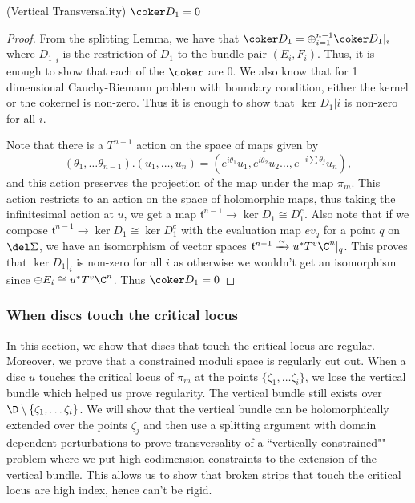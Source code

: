 \begin{Theorem}(Vertical Transversality)\label{thm:verttran}
$\coker D_1 = 0$
\end{Theorem}
\begin{proof}
From the splitting Lemma, we have that $\coker D_1 = \oplus_{i=1}^{n-1} \coker D_1|_i$ where $D_1|_i$ is the restriction of $D_1$ to the bundle pair $(E_i,F_i)$. Thus, it is enough to show that each of the $\coker$ are 0. We also know that for 1 dimensional Cauchy-Riemann problem with boundary condition, either the kernel or the cokernel is non-zero. Thus it is enough to show that $\ker D_1|i$ is non-zero for all $i$.


Note that there is a $T^{n-1}$ action on the space of maps given by $$(\theta_1, \dots \theta_{n-1}). (u_1,\dots,u_n) = (e^{i\theta_1}u_1,e^{i\theta_2}u_2\dots,e^{-i\sum\theta_j}u_n),$$ and this action preserves the projection of the map under the map $\pi_m$. This action restricts to an action on the space of holomorphic maps, thus taking the infinitesimal action at $u$, we get a map $\mathfrak{t}^{n-1} \to \ker D_1 \cong D^c_1$. Also note that if we compose $\mathfrak{t}^{n-1} \to \ker D_1 \cong \ker D^c_1$ with the evaluation map $ev_q$ for a point $q$ on $\del \Sigma$, we have an isomorphism of vector spaces $\mathfrak{t}^{n-1} \xrightarrow{\sim} u^*T^v\C^n|_q $. This proves that $\ker D_1|_i$ is non-zero for all $i$ as otherwise we wouldn't get an isomorphism since $\oplus E_i \cong u^*T^v\C^n$. Thus $\coker D_1 = 0$
\end{proof}



\subsubsection{When discs touch the critical locus}

In this section, we show that discs that touch the critical locus are regular. Moreover, we prove that a constrained moduli space is regularly cut out. When a disc $u$ touches the critical locus of $\pi_m$ at the points $\{\zeta_1,\dots \zeta_i\}$, we lose the vertical bundle which helped us prove regularity.  The vertical bundle still exists over $\D \setminus \{\zeta_1,\dots \zeta_i\} $. We will show that the vertical bundle can be holomorphically extended over the points $\zeta_j$ and then use a splitting argument with domain dependent perturbations to prove transversality of a ``vertically constrained"" problem where we put high codimension constraints to the extension of the vertical bundle. This allows us to show that broken strips that touch the critical locus are high index, hence can't be rigid.


